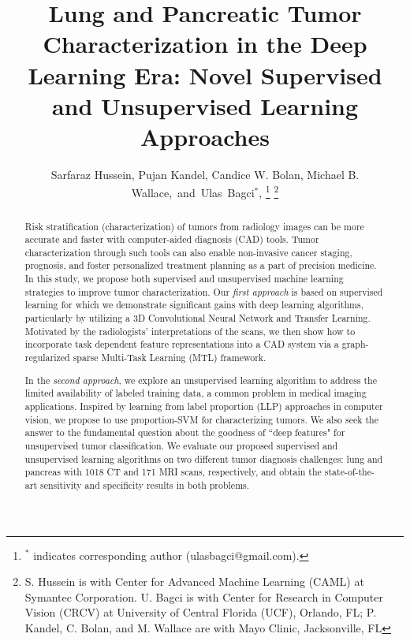 \documentclass[journal]{IEEEtran}
\begin{document}
\title{Lung and Pancreatic Tumor Characterization in the Deep Learning Era: Novel Supervised and Unsupervised Learning Approaches }

\author{Sarfaraz Hussein, Pujan Kandel, Candice W. Bolan, Michael B. Wallace,~and~Ulas~Bagci$^*$, 
  \thanks{$^*$ indicates corresponding author (ulasbagci@gmail.com).}%
 \thanks{S. Hussein is with Center for Advanced Machine Learning (CAML) at Symantec Corporation. U. Bagci is with Center for Research in Computer Vision (CRCV) at University of Central Florida (UCF), Orlando, FL; P. Kandel, C. Bolan, and M. Wallace are with Mayo Clinic, Jacksonville, FL}}

\maketitle

\begin{abstract}
Risk stratification (characterization) of tumors from radiology images can be more accurate and faster with computer-aided diagnosis (CAD) tools. %
Tumor characterization through such tools can also enable non-invasive cancer staging, prognosis, and foster personalized treatment planning as a part of precision medicine. 
In this study, we propose both supervised and unsupervised machine learning strategies to improve tumor characterization. Our \textit{first approach} is based on supervised learning for which we demonstrate significant gains with deep learning algorithms, particularly by utilizing a 3D Convolutional Neural Network and Transfer Learning. 
Motivated by the radiologists' interpretations of the scans, we then show how to incorporate task dependent feature representations into a CAD system via a graph-regularized sparse Multi-Task Learning (MTL) framework. 

In the \textit{second approach}, we explore an unsupervised learning algorithm to address the limited availability of labeled training data, a common problem in medical imaging applications. Inspired by learning from label proportion (LLP) approaches in computer vision, we propose to use proportion-SVM for characterizing tumors. We also seek the answer to the fundamental question about the goodness of ``deep features" for unsupervised tumor classification. 
We evaluate our proposed supervised and unsupervised learning algorithms on two different tumor diagnosis challenges: lung and pancreas with 1018 CT and 171 MRI scans, respectively, and obtain the state-of-the-art sensitivity and specificity results in both problems. 

\end{abstract}
\end{document}

